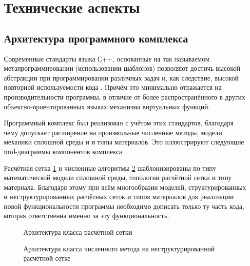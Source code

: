 \section{Технические аспекты}
\subsection{Архитектура программного комплекса}
Современные стандарты языка С++, основанные на так называемом метапрограммировании (использовании шаблонов) позволяют достичь высокой абстракции при программировании различных задач и, как следствие, высокой повторной используемости кода \cite{alexandrescu}. Причём это минимально отражается на производительности программы, в отличие от более распространённого в других объектно-ориентированных языках механизма виртуальных функций.

Программный комплекс был реализован с учётом этих стандартов, благодаря чему допускает расширение на произвольные численные методы, модели механики сплошной среды и и типы материалов. Это иллюстрируют следующие uml-диаграммы компонентов комплекса.

Расчётная сетка \ref{pic:uml-mesh} и численные алгоритмы \ref{pic:uml-gcm} шаблонизированы по типу математической модели сплошной среды, топологии расчётной сетки и типу материала. Благодаря этому при всём многообразии моделей, структурированных и неструктурированных расчётных сеток и типов материалов для реализации новой функциональности программы необходимо дописать только ту часть кода, которая ответственна именно за эту функциональность.

\begin{figure}[H]
	\caption{Архитектура класса расчётной сетки}
	\label{pic:uml-mesh}
\end{figure}

\begin{figure}[H]
	\caption{Архитектура класса численного метода на неструктурированной расчётной сетке}
	\label{pic:uml-gcm}
\end{figure}

